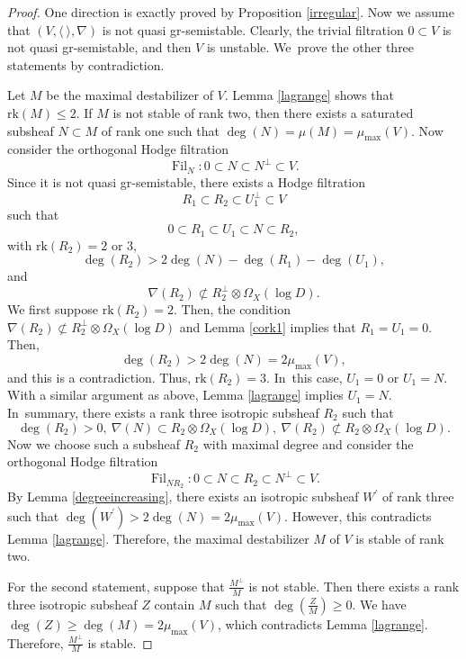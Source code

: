 \documentclass[11pt]{article}
\numberwithin{equation}{section}
\newcommand{\grsemistable}{gr\nobreakdash-semi\-stable\xspace}
\DeclareMathOperator{\Filt}{Fil}
\newcommand{\rk}{\mathrm{rk}}
\theoremstyle{plain}
\theoremstyle{definition}
\begin{document}
\begin{proof}
One direction is exactly proved by Proposition \ref{irregular}. Now we assume that $(V,\langle \ \rangle,\nabla)$ is not quasi \grsemistable. Clearly, the trivial filtration $0 \subset V$ is not quasi \grsemistable, and then $V$ is unstable. We~prove the other three statements by contradiction.

Let $M$ be the maximal destabilizer of $V$. Lemma \ref{lagrange} shows that $\rk(M) \leq 2$. If $M$ is not stable of rank two, then there exists a saturated subsheaf $N \subset M$ of rank one such that $\deg(N)=\mu(M)=\mu_{\max}(V)$. Now consider the orthogonal Hodge filtration
\[
\Filt_{N}:0\subset N\subset N^\perp\subset V.
\]
Since it is not quasi \grsemistable, there exists a Hodge filtration
\[
R_1\subset R_2\subset U_1^\perp\subset V
\]
such that
\[
0\subset R_1\subset U_1\subset N \subset R_2,
\]
with $\rk(R_2)=2$ or $3$,
\[
\deg(R_2)>2\deg(N)-\deg(R_1)-\deg(U_1),
\]
and
\[
\nabla(R_2)\not\subset R_2^\perp\otimes\Omega_X(\log D).
\]
We first suppose $\rk(R_2)=2$. Then, the condition $\nabla(R_2)\not\subset R_2^\perp\otimes\Omega_X(\log D)$ and Lemma \ref{cork1} implies that $R_1 = U_1 = 0$. Then,
\[
\deg(R_2)>2\deg(N)=2\mu_{\max}(V),
\]
and this is a contradiction. Thus, $\rk(R_2)=3$. In~this case, $U_1=0$ or $U_1 = N$. With a similar argument as above, Lemma \ref{lagrange} implies $U_1=N$. In~summary, there exists a rank three isotropic subsheaf $R_2$ such that
\[
\deg(R_2)>0,\ \nabla(N)\subset R_2 \otimes \Omega_X(\log D),\ \nabla(R_2)\not\subset R_2 \otimes \Omega_X(\log D).
\]
Now we choose such a subsheaf $R_2$ with maximal degree and consider the orthogonal Hodge filtration
\[
\Filt_{NR_2}:0\subset N\subset R_2\subset N^\perp \subset V.
\]
By Lemma \ref{degreeincreasing}, there exists an isotropic subsheaf $W^\prime$ of rank three such that $\deg(W^\prime)>2\deg(N)=2\mu_{\max}(V)$. However, this contradicts Lemma \ref{lagrange}. Therefore, the maximal destabilizer $M$ of $V$ is stable of rank two.

For the second statement, suppose that $\frac{M^\perp}{M}$ is not stable. Then there exists a rank three isotropic subsheaf $Z$ contain $M$ such that $\deg(\frac{Z}{M})\geq 0$. We have $\deg(Z)\geq \deg(M)=2\mu_{\max}(V)$, which contradicts Lemma \ref{lagrange}. Therefore, $\frac{M^\perp}{M}$ is stable.


\end{proof}
\end{document}

